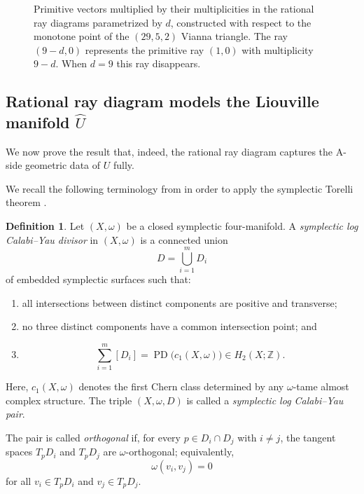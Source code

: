 \documentclass[11pt, reqno]{amsart}
\theoremstyle{definition}
\newtheorem{definition}[theorem]{Definition}
\begin{document}
\begin{figure}[p!]

    \caption{Primitive vectors multiplied by their multiplicities in
    the rational ray diagrams parametrized by $d$, constructed with
    respect to the monotone point of the $(29,5,2)$ Vianna triangle.
    The ray $(9-d,0)$ represents the primitive ray $(1,0)$ with
    multiplicity $9-d$. When $d=9$ this ray disappears.}
    \label{fig-fan}

\end{figure}

\FloatBarrier


\subsection{Rational ray diagram models the Liouville manifold $\widehat{U}$}

We now prove the result that, indeed, the rational ray diagram captures the A-side geometric data of $U$ fully.

We recall the following terminology from \cite{LMN25,LMN23} in order to apply the symplectic Torelli theorem \cite[Theorem 13]{LMN23}.

\begin{definition}
Let $(X,\omega)$ be a closed symplectic four-manifold. A
\emph{symplectic log Calabi--Yau divisor} in $(X,\omega)$ is a
connected union
\[
D=\bigcup_{i=1}^m D_i
\]
of embedded symplectic surfaces such that:
\begin{enumerate}
    \item all intersections between distinct components are positive and
    transverse;
    \item no three distinct components have a common intersection point; and
    \item
    \[
    \sum_{i=1}^m [D_i]
    =
    \operatorname{PD}\bigl(c_1(X,\omega)\bigr)
    \in H_2(X;\mathbb{Z}).
    \]
\end{enumerate}
Here, $c_1(X,\omega)$ denotes the first Chern class determined by any
$\omega$-tame almost complex structure. The triple $(X,\omega,D)$ is
called a \emph{symplectic log Calabi--Yau pair}.

The pair is called \emph{orthogonal} if, for every
$p\in D_i\cap D_j$ with $i\neq j$, the tangent spaces $T_pD_i$ and
$T_pD_j$ are $\omega$-orthogonal; equivalently,
\[
\omega(v_i,v_j)=0
\]
for all $v_i\in T_pD_i$ and $v_j\in T_pD_j$.
\end{definition}
\end{document}
